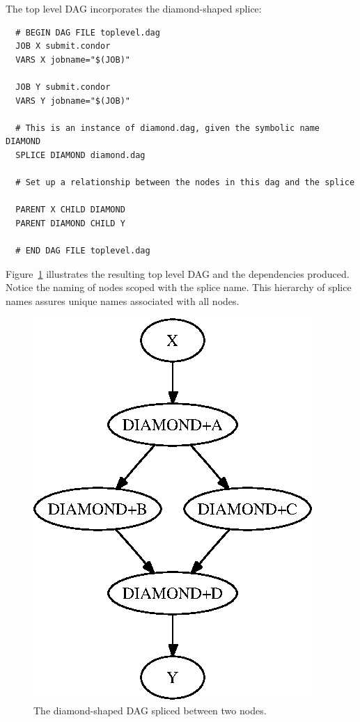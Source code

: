 The top level DAG incorporates the diamond-shaped splice:

\begin{verbatim}
  # BEGIN DAG FILE toplevel.dag
  JOB X submit.condor
  VARS X jobname="$(JOB)"

  JOB Y submit.condor
  VARS Y jobname="$(JOB)"

  # This is an instance of diamond.dag, given the symbolic name DIAMOND
  SPLICE DIAMOND diamond.dag

  # Set up a relationship between the nodes in this dag and the splice

  PARENT X CHILD DIAMOND
  PARENT DIAMOND CHILD Y

  # END DAG FILE toplevel.dag
\end{verbatim}

Figure~\ref{fig:dagman-splice-simple} illustrates the resulting
top level DAG and the dependencies produced. 
Notice the naming of nodes
scoped with the splice name.
This hierarchy of splice names assures unique names associated with all nodes.

\begin{figure}
\centering
\includegraphics{user-man/splice-simple}
\caption{\label{fig:dagman-splice-simple} The diamond-shaped DAG spliced between two nodes.}
\end{figure}


